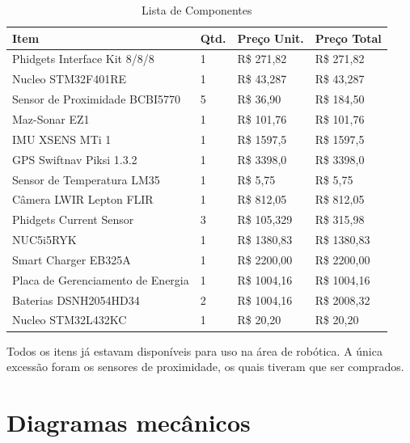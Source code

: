 \begin{table}[]
\centering
\begin{tabular}{|l|l|l|l|}
\hline
{Item}                           & {Qtd.} & {Preço Unit.} & {Preço Total}  \\ \hline
Phidgets Interface Kit 8/8/8     & 1  & R\$ 271,82  & R\$ 271,82  \\ \hline
Nucleo STM32F401RE               & 1  & R\$ 43,287  & R\$ 43,287  \\ \hline
Sensor de Proximidade BCBI5770   & 5  & R\$ 36,90   & R\$ 184,50  \\ \hline
Maz-Sonar EZ1                    & 1  & R\$ 101,76  & R\$ 101,76  \\ \hline
IMU XSENS MTi 1                  & 1  & R\$ 1597,5  & R\$ 1597,5  \\ \hline
GPS Swiftnav Piksi 1.3.2         & 1  & R\$ 3398,0  & R\$ 3398,0  \\ \hline
Sensor de Temperatura LM35       & 1  & R\$ 5,75    & R\$ 5,75    \\ \hline
Câmera LWIR Lepton FLIR          & 1  & R\$ 812,05  & R\$ 812,05  \\ \hline
Phidgets Current Sensor          & 3  & R\$ 105,329 & R\$ 315,98  \\ \hline
NUC5i5RYK                        & 1  & R\$ 1380,83 & R\$ 1380,83 \\ \hline
Smart Charger EB325A             & 1  & R\$ 2200,00 & R\$ 2200,00 \\ \hline
Placa de Gerenciamento de Energia & 1 & R\$ 1004,16 & R\$ 1004,16 \\ \hline
Baterias DSNH2054HD34            & 2  & R\$ 1004,16 & R\$ 2008,32 \\ \hline
Nucleo STM32L432KC                      & 1  & R\$ 20,20   & R\$ 20,20   \\ \hline
\end{tabular}

\caption{Lista de Componentes}
\end{table}
\pagebreak
Todos os itens já estavam disponíveis para uso na área de robótica. A única excessão foram os sensores de proximidade, os quais tiveram que ser comprados.



\section{Diagramas mecânicos}
\label{sec:diagm}


